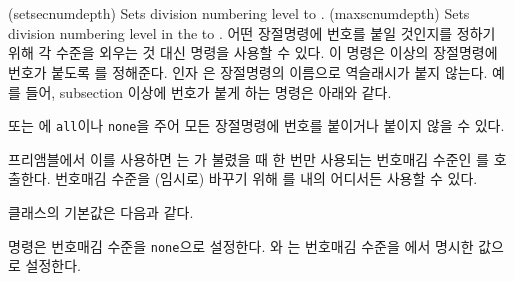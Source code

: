 \begin{syntax}
\cmd{\setsecnumdepth} \\
\cmd{\maxsecnumdepth} \\
\end{syntax}
\glossary(setsecnumdepth)%
  {}%
  {Sets division numbering level to .}
\glossary(maxscnumdepth)%
  {}%
  {Sets division numbering level in the  to .}
어떤 장절명령에 번호를 붙일 것인지를 정하기 위해 각 수준을 외우는 것 대신
\cmd{\setsecnumdepth} 명령을 사용할 수 있다. 이 명령은  이상의
장절명령에 번호가 붙도록 를 정해준다. 인자 은
장절명령의 이름으로 역슬래시가 붙지 않는다. 예를 들어, subsection 이상에 번호가
붙게 하는 명령은 아래와 같다.
\begin{lcode}
\end{lcode}
또는 에 \texttt{all}이나 \texttt{none}을 주어 모든 장절명령에
번호를 붙이거나 붙이지 않을 수 있다.

프리앰블에서 이를 사용하면 \cmd{\setsecnumdepth}는
\cmd{\mainmatter}가 불렸을 때 한 번만 사용되는 번호매김 수준인
\cmd{\maxsecnumdepth}를 호출한다. 번호매김 수준을 (임시로) 바꾸기 위해
\cmd{\setsecnumdepth}를 \cmd{\mainmatter} 내의 어디서든 사용할 수 있다.

클래스의 기본값은 다음과 같다.
\begin{lcode}
\end{lcode}
\cmd{\frontmatter} 명령은 번호매김 수준을 \texttt{none}으로 설정한다.
\cmd{\mainmatter}와 는 번호매김 수준을 \cmd{\maxsecnumdepth}에서
명시한 값으로 설정한다.

